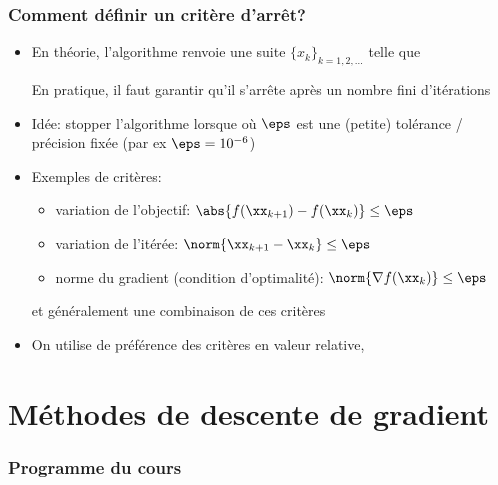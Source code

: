 \documentclass[9pt,table]{beamer} %
\begin{document}
\begin{frame}
\frametitle{Comment définir un critère d'arrêt?}

\begin{itemize}[label=\tiny$\blacksquare$]
	\item \alert{En théorie}, l'algorithme renvoie une suite $\{x_k\}_{k=1,2,\ldots}$ telle que 
	
	\alert{En pratique}, il faut garantir qu'il s'arrête après un nombre \alert{fini} d'itérations
	
	\item Idée: stopper l'algorithme lorsque
	où $\eps$ est une (petite) tolérance / précision fixée (par ex $\eps = 10^{-6}$)
	
	\pause
	
	\vfill
	
	\item Exemples de critères:
	\begin{itemize}[label=-]
		\item variation de l'objectif: $\abs{f(\xx_{k+1}) - f(\xx_{k})} \leq \eps$
		\item variation de l'itérée: $\norm{\xx_{k+1} - \xx_{k}} \leq \eps$
		\item norme du gradient (condition d'optimalité): $\norm{\nabla f(\xx_k)} \leq \eps$
	\end{itemize}
	et généralement une combinaison de ces critères
	
	\item On utilise de préférence des critères en valeur \alert{relative}, \eg
\end{itemize}
\end{frame}


\section{Méthodes de descente de gradient}
\begin{frame}
\frametitle{Programme du cours}
\tableofcontents[currentsection]
\end{frame}
\end{document}
